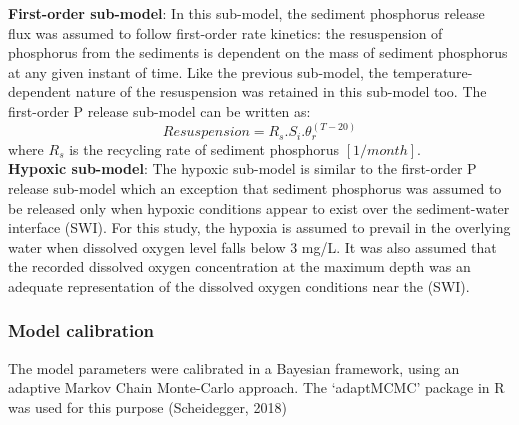 \documentclass[fleqn]{article}
\begin{document}
\textbf{First-order sub-model}: In this sub-model, the sediment phosphorus release flux was assumed to follow first-order rate kinetics: the resuspension of phosphorus from the sediments is dependent on the mass of sediment phosphorus at any given instant of time. Like the previous sub-model, the temperature-dependent nature of the resuspension was retained in this sub-model too. The first-order P release sub-model can be written as:
\begin{equation}
    Resuspension = R_s.S_i.\theta_r^{(T-20)}
    \label{eqn:FirstOrderModel}
\end{equation}
where $R_s$ is the recycling rate of sediment phosphorus $[1/month]$.\\
\textbf{Hypoxic sub-model}: The hypoxic sub-model is similar to the first-order P release sub-model which an exception that sediment phosphorus was assumed to be released only when hypoxic conditions appear to exist over the sediment-water interface (SWI). For this study, the hypoxia is assumed to prevail in the overlying water when dissolved oxygen level falls below 3 mg/L. It was also assumed that the recorded dissolved oxygen concentration at the maximum depth was an adequate representation of the dissolved oxygen conditions near the (SWI).  
\subsubsection{Model calibration}
The model parameters were calibrated in a Bayesian framework, using an adaptive Markov Chain Monte-Carlo approach. The ‘adaptMCMC’ package in R was used for this purpose (Scheidegger, 2018)
\newpage
\printbibliography
\end{document}
